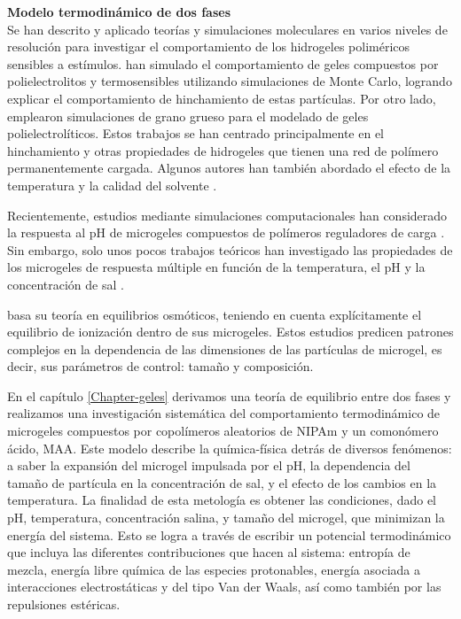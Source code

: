 \textbf{Modelo termodin\'amico de dos fases} \\
Se han descrito y aplicado teor\'ias y simulaciones moleculares en varios niveles de resoluci\'on para investigar el comportamiento de los hidrogeles polim\'ericos sensibles a est\'imulos.
\citet{quesada2011gel} han simulado el comportamiento de geles compuestos por polielectrolitos y termosensibles utilizando simulaciones de Monte Carlo, logrando explicar el comportamiento de hinchamiento de estas part\'iculas. Por otro lado, \citet{ahualli2016coarse} emplearon simulaciones de grano grueso para el modelado de geles polielectrol\'iticos. Estos trabajos se han centrado principalmente en el hinchamiento y otras propiedades de hidrogeles que tienen una red de pol\'imero permanentemente cargada. Algunos autores han tambi\'en abordado el efecto de la temperatura y la calidad del solvente \cite{Jha2011, QuesadaPerez2013, moncho-jorda2016a, ahualli2016coarse, AdroherBenitez2017PCCP}.

Recientemente, estudios mediante simulaciones computacionales han considerado la respuesta al pH de microgeles compuestos de pol\'imeros reguladores de carga \cite{Schroeder2015,Rud2017,Sean2018, Hofzumahaus2018,Lu2019}.
Sin embargo, solo unos pocos trabajos te\'oricos han investigado las propiedades de los microgeles de respuesta m\'ultiple en funci\'on de la temperatura, el pH y la concentraci\'on de sal \cite{CaprilesGonzalez2008,polotsky2013collapse}.

\citet{polotsky2013collapse} basa su teor\'ia en equilibrios osm\'oticos, teniendo en cuenta expl\'icitamente el equilibrio de ionizaci\'on dentro de sus microgeles. Estos estudios predicen patrones complejos en la dependencia de las dimensiones de las part\'iculas de microgel, es decir, sus par\'ametros de control: tama\~no y composici\'on.

En el cap\'itulo \ref{Chapter-geles} derivamos una teor\'ia de equilibrio entre dos fases y realizamos una investigaci\'on sistem\'atica del comportamiento termodin\'amico de microgeles compuestos por copol\'imeros aleatorios de NIPAm y un comon\'omero \'acido, MAA. Este modelo describe la qu\'imica-f\'isica detr\'as de diversos fen\'omenos: a saber la expansi\'on del microgel impulsada por el pH, la dependencia del tama\~no de part\'icula en la concentraci\'on de sal, y el efecto de los cambios en la temperatura. La finalidad de esta metolog\'ia es obtener las condiciones, dado el pH, temperatura, concentraci\'on salina, y tama\~no del microgel, que minimizan la energ\'ia  del sistema. Esto se logra a  trav\'es de escribir un potencial termodin\'amico que incluya las diferentes contribuciones que hacen al sistema: entrop\'ia de mezcla, energ\'ia libre qu\'imica de las especies protonables, energ\'ia asociada a interacciones electrost\'aticas y del tipo Van der Waals, as\'i  como tambi\'en por las repulsiones est\'ericas.  


